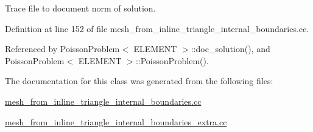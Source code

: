 Trace file to document norm of solution. 



Definition at line 152 of file mesh\+\_\+from\+\_\+inline\+\_\+triangle\+\_\+internal\+\_\+boundaries.\+cc.



Referenced by Poisson\+Problem$<$ E\+L\+E\+M\+E\+N\+T $>$\+::doc\+\_\+solution(), and Poisson\+Problem$<$ E\+L\+E\+M\+E\+N\+T $>$\+::\+Poisson\+Problem().



The documentation for this class was generated from the following files\+:\begin{DoxyCompactItemize}
\item 
\hyperlink{mesh__from__inline__triangle__internal__boundaries_8cc}{mesh\+\_\+from\+\_\+inline\+\_\+triangle\+\_\+internal\+\_\+boundaries.\+cc}\item 
\hyperlink{mesh__from__inline__triangle__internal__boundaries__extra_8cc}{mesh\+\_\+from\+\_\+inline\+\_\+triangle\+\_\+internal\+\_\+boundaries\+\_\+extra.\+cc}\end{DoxyCompactItemize}
